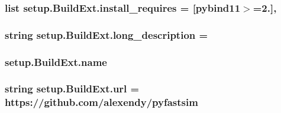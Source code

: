 \subsubsection[{\texorpdfstring{install\+\_\+requires}{install_requires}}]{\setlength{\rightskip}{0pt plus 5cm}list setup.\+Build\+Ext.\+install\+\_\+requires = \mbox{[}\textquotesingle{}pybind11$>$=2.\textquotesingle{}\mbox{]},\hspace{0.3cm}{\ttfamily [static]}}\hypertarget{classsetup_1_1_build_ext_a12adc406aee45851d969d0b07b538df7}{}\label{classsetup_1_1_build_ext_a12adc406aee45851d969d0b07b538df7}
\subsubsection[{\texorpdfstring{long\+\_\+description}{long_description}}]{\setlength{\rightskip}{0pt plus 5cm}string setup.\+Build\+Ext.\+long\+\_\+description = \textquotesingle{}\textquotesingle{}\hspace{0.3cm}{\ttfamily [static]}}\hypertarget{classsetup_1_1_build_ext_a92bd98830f1ca88bc0806bf2883f5ab1}{}\label{classsetup_1_1_build_ext_a92bd98830f1ca88bc0806bf2883f5ab1}
\subsubsection[{\texorpdfstring{name}{name}}]{\setlength{\rightskip}{0pt plus 5cm}setup.\+Build\+Ext.\+name\hspace{0.3cm}{\ttfamily [static]}}\hypertarget{classsetup_1_1_build_ext_a63cde2a550ddf707e22d4f93dc271590}{}\label{classsetup_1_1_build_ext_a63cde2a550ddf707e22d4f93dc271590}
\subsubsection[{\texorpdfstring{url}{url}}]{\setlength{\rightskip}{0pt plus 5cm}string setup.\+Build\+Ext.\+url = \textquotesingle{}https\+://github.\+com/alexendy/pyfastsim\textquotesingle{}\hspace{0.3cm}{\ttfamily [static]}}\hypertarget{classsetup_1_1_build_ext_a968e2d21a5cf459eb0091efa406b8e2c}{}\label{classsetup_1_1_build_ext_a968e2d21a5cf459eb0091efa406b8e2c}

